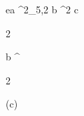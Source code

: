 \begin{eqcode}{e}{a }{^2_{5,2}}{}
  b \in {}^2 \lend
  c \gets
  \begin{tmatrix}
  2  \lend
  \end{tmatrix} \lend
  b \gets \genar \limits ^ {  \begin{tmatrix} %
  2  \lend
  \end{tmatrix} }(c) \lend 
\end{eqcode}
